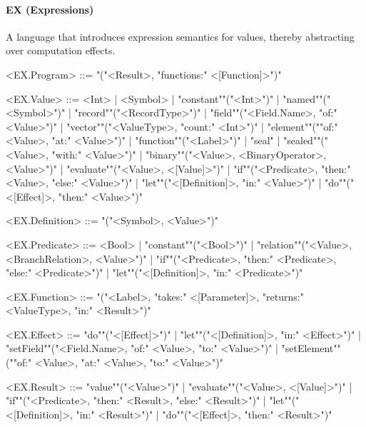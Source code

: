 \documentclass[main.tex]{subfiles}
\begin{document}
\paragraph{ EX (Expressions) } A language that introduces expression semantics for values, thereby abstracting over computation effects.
\begin{grammar}
	\footnotesize
				<EX.Program> ::=
							"("<Result>, "functions:" <[Function]>")"
				\par
				<EX.Value> ::=
						<Int> |
								<Symbol> |
						"constant""("<Int>")"
						| "named""("<Symbol>")"
						| "record""("<RecordType>")"
						| "field""("<Field.Name>, "of:" <Value>")"
						| "vector""("<ValueType>, "count:" <Int>")"
						| "element""(""of:" <Value>, "at:" <Value>")"
						| "function""("<Label>")"
						| "seal"
						| "sealed""("<Value>, "with:" <Value>")"
						| "binary""("<Value>, <BinaryOperator>, <Value>")"
						| "evaluate""("<Value>, <[Value]>")"
						| "if""("<Predicate>, "then:" <Value>, "else:" <Value>")"
						| "let""("<[Definition]>, "in:" <Value>")"
						| "do""("<[Effect]>, "then:" <Value>")"
				\par
				<EX.Definition> ::=
							"("<Symbol>, <Value>")"
				\par
				<EX.Predicate> ::=
						<Bool> |
						"constant""("<Bool>")"
						| "relation""("<Value>, <BranchRelation>, <Value>")"
						| "if""("<Predicate>, "then:" <Predicate>, "else:" <Predicate>")"
						| "let""("<[Definition]>, "in:" <Predicate>")"
				\par
				<EX.Function> ::=
							"("<Label>, "takes:" <[Parameter]>, "returns:" <ValueType>, "in:" <Result>")"
				\par
				<EX.Effect> ::=
						"do""("<[Effect]>")"
						| "let""("<[Definition]>, "in:" <Effect>")"
						| "setField""("<Field.Name>, "of:" <Value>, "to:" <Value>")"
						| "setElement""(""of:" <Value>, "at:" <Value>, "to:" <Value>")"
				\par
				<EX.Result> ::=
						"value""("<Value>")"
						| "evaluate""("<Value>, <[Value]>")"
						| "if""("<Predicate>, "then:" <Result>, "else:" <Result>")"
						| "let""("<[Definition]>, "in:" <Result>")"
						| "do""("<[Effect]>, "then:" <Result>")"
				\par
\end{grammar}
\par
\end{document}
